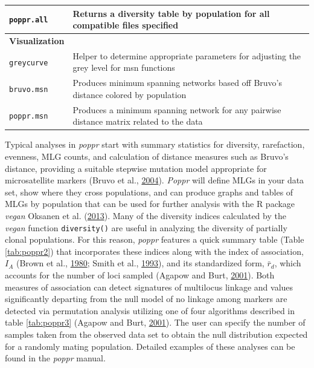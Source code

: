 \documentclass[double,12pt]{beavtex}
\begin{document}
\begin{table}
\begin{tabular}{ll}
  \texttt{poppr.all} & Returns a diversity table by population for all compatible files specified \\
  \hline
  \textbf{Visualization} & \\
  \texttt{greycurve} & Helper to determine appropriate parameters for adjusting the grey level for msn functions \\
  \texttt{bruvo.msn} & Produces minimum spanning networks based off Bruvo's distance colored by population \\
  \texttt{poppr.msn} & Produces a minimum spanning network for any pairwise distance matrix related to the data \\
  \hline
  
  \end{tabular}
  \end{table}
  
  Typical analyses in \emph{poppr} start with summary statistics for
  diversity, rarefaction, evenness, MLG counts, and calculation of
  distance measures such as Bruvo's distance, providing a suitable
  stepwise mutation model appropriate for microsatellite markers (Bruvo et
  al., \protect\hyperlink{ref-bruvo2004simple}{2004}). \emph{Poppr} will
  define MLGs in your data set, show where they cross populations, and can
  produce graphs and tables of MLGs by population that can be used for
  further analysis with the R package \emph{vegan} Oksanen et al.
  (\protect\hyperlink{ref-oksanen2013vegan}{2013}). Many of the diversity
  indices calculated by the \emph{vegan} function \texttt{diversity()} are
  useful in analyzing the diversity of partially clonal populations. For
  this reason, \emph{poppr} features a quick summary table (Table
  \ref{tab:poppr2}) that incorporates these indices along with the index
  of association, \(I_A\) (Brown et al.,
  \protect\hyperlink{ref-brown1980multilocus}{1980}; Smith et al.,
  \protect\hyperlink{ref-smith1993how}{1993}), and its standardized form,
  \(\bar{r}_d\), which accounts for the number of loci sampled (Agapow and
  Burt, \protect\hyperlink{ref-Agapow_2001}{2001}). Both measures of
  association can detect signatures of multilocus linkage and values
  significantly departing from the null model of no linkage among markers
  are detected via permutation analysis utilizing one of four algorithms
  described in table \ref{tab:poppr3} (Agapow and Burt,
  \protect\hyperlink{ref-Agapow_2001}{2001}). The user can specify the
  number of samples taken from the observed data set to obtain the null
  distribution expected for a randomly mating population. Detailed
  examples of these analyses can be found in the \emph{poppr} manual.
  
\end{document}
